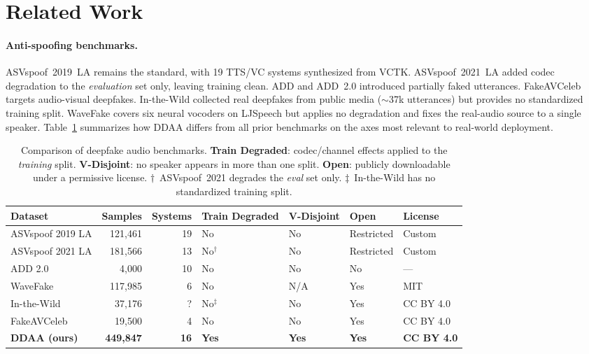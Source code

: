 \documentclass{article}
\newcommand{\ddaa}{\textsc{DDAA}}
\begin{document}
\section{Related Work}
\label{sec:related}

\paragraph{Anti-spoofing benchmarks.}
ASVspoof~2019~LA \citep{asvspoof2019} remains the standard, with 19 TTS/VC
systems synthesized from VCTK.  ASVspoof~2021~LA \citep{asvspoof2021} added
codec degradation to the \emph{evaluation} set only, leaving training clean.
ADD \citep{yi2022add} and ADD~2.0 \citep{yi2023add2} introduced partially
faked utterances.  FakeAVCeleb \citep{khalid2021fakeavceleb} targets
audio-visual deepfakes.  In-the-Wild \citep{muller2022does} collected real
deepfakes from public media ($\sim$37k utterances) but provides no
standardized training split.  WaveFake \citep{frank2021wavefake} covers
six neural vocoders on LJSpeech but applies no degradation and fixes the
real-audio source to a single speaker.  Table~\ref{tab:benchmark_compare}
summarizes how \ddaa{} differs from all prior benchmarks on the axes most
relevant to real-world deployment.

\begin{table}[h]
  \caption{Comparison of deepfake audio benchmarks. \textbf{Train Degraded}:
  codec/channel effects applied to the \emph{training} split.
  \textbf{V-Disjoint}: no speaker appears in more than one split.
  \textbf{Open}: publicly downloadable under a permissive license.
  $\dagger$~ASVspoof~2021 degrades the \emph{eval} set only.
  $\ddagger$~In-the-Wild has no standardized training split.}
  \label{tab:benchmark_compare}
  \centering
  \small
  \setlength{\tabcolsep}{4.5pt}
  \begin{tabular}{lrrllll}
    \toprule
    Dataset & Samples & Systems & Train Degraded & V-Disjoint & Open & License \\
    \midrule
    ASVspoof 2019 LA \citep{asvspoof2019}  & 121,461  & 19 & No              & No  & Restricted & Custom \\
    ASVspoof 2021 LA \citep{asvspoof2021}  & 181,566  & 13 & No$^\dagger$    & No  & Restricted & Custom \\
    ADD 2.0 \citep{yi2023add2}             &   4,000  & 10 & No              & No  & No         & ---    \\
    WaveFake \citep{frank2021wavefake}     & 117,985  &  6 & No              & N/A & Yes        & MIT    \\
    In-the-Wild \citep{muller2022does}     &  37,176  & ?  & No$^\ddagger$   & No  & Yes        & CC BY 4.0 \\
    FakeAVCeleb \citep{khalid2021fakeavceleb} & 19,500 & 4 & No             & No  & Yes        & CC BY 4.0 \\
    \midrule
    \textbf{\ddaa{} (ours)}                & \textbf{449,847} & \textbf{16} & \textbf{Yes} & \textbf{Yes} & \textbf{Yes} & \textbf{CC BY 4.0} \\
    \bottomrule
  \end{tabular}
\end{table}
\end{document}
